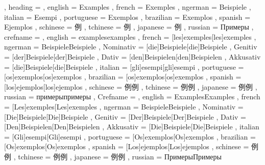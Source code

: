   {
    , heading =   {
                    , english     = Examples
                    , french      = Exemples
                    , ngerman     = Beispiele
                    , italian     = Esempi
                    , portuguese  = Exemplos
                    , brazilian   = Exemplos
                    , spanish     = Ejemplos
                    , schinese    = 例
                    , tchinese    = 例
                    , japanese    = 例
                    , russian     = Примеры
                  }
    , crefname =  {
                    , english     = {examples}{examples}
                    , french      = [les]{exemples}[les]{exemples}
                    , ngerman     = { {Beispiele}{Beispiele}
                                      , Nominativ = [die]{Beispiele}[die]{Beispiele}
                                      , Genitiv   = [der]{Beispiele}[der]{Beispiele}
                                      , Dativ     = [den]{Beispielen}[den]{Beispielen}
                                      , Akkusativ = [die]{Beispiele}[die]{Beispiele}
                                    }
                    , italian     = [gli]{esempi}[gli]{esempi}
                    , portuguese  = [os]{exemplos}[os]{exemplos}
                    , brazilian   = [os]{exemplos}[os]{exemplos}
                    , spanish     = [los]{ejemplos}[los]{ejemplos}
                    , schinese    = {例}{例}
                    , tchinese    = {例}{例}
                    , japanese    = {例}{例}
                    , russian     = {примеры}{примеры}
                  }
    , Crefname =  {
                    , english     = {Examples}{Examples}
                    , french      = [Les]{exemples}[Les]{exemples}
                    , ngerman     = { {Beispiele}{Beispiele}
                                      , Nominativ = [Die]{Beispiele}[Die]{Beispiele}
                                      , Genitiv   = [Der]{Beispiele}[Der]{Beispiele}
                                      , Dativ     = [Den]{Beispielen}[Den]{Beispielen}
                                      , Akkusativ = [Die]{Beispiele}[Die]{Beispiele}
                                    }
                    , italian     = [Gli]{esempi}[Gli]{esempi}
                    , portuguese  = [Os]{exemplos}[Os]{exemplos}
                    , brazilian   = [Os]{exemplos}[Os]{exemplos}
                    , spanish     = [Los]{ejemplos}[Los]{ejemplos}
                    , schinese    = {例}{例}
                    , tchinese    = {例}{例}
                    , japanese    = {例}{例}
                    , russian     = {Примеры}{Примеры}
                  }
  }

